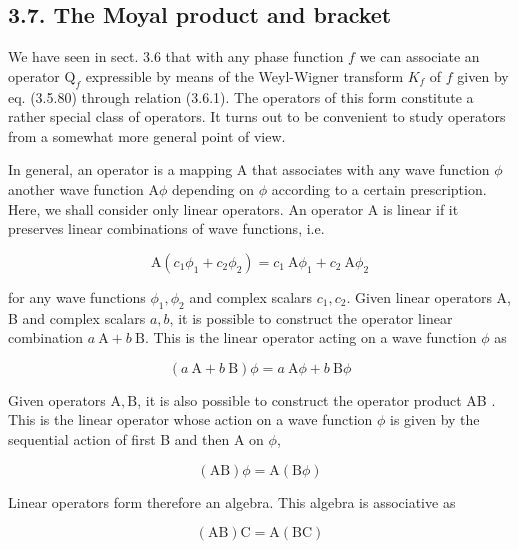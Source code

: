 \documentclass{article}
\begin{document}
\subsection*{3.7. The Moyal product and bracket}

We have seen in sect. 3.6 that with any phase function $f$ we can associate an operator $\mathrm{Q}_{f}$ expressible by means of the Weyl-Wigner transform $K_{f}$ of $f$ given by eq. (3.5.80) through relation (3.6.1). The operators of this form constitute a rather special class of operators. It turns out to be convenient to study operators from a somewhat more general point of view.

In general, an operator is a mapping A that associates with any wave function $\phi$ another wave function $\mathrm{A} \phi$ depending on $\phi$ according to a certain prescription. Here, we shall consider only linear operators. An operator A is linear if it preserves linear combinations of wave functions, i.e.
 
\begin{equation*}
\mathrm{A}\left(c_{1} \phi_{1}+c_{2} \phi_{2}\right)=c_{1} \mathrm{~A} \phi_{1}+c_{2} \mathrm{~A} \phi_{2} \tag{3.7.1}
\end{equation*}
 
for any wave functions $\phi_{1}, \phi_{2}$ and complex scalars $c_{1}, c_{2}$. Given linear operators A, B and complex scalars $a, b$, it is possible to construct the operator linear combination $a \mathrm{~A}+b \mathrm{~B}$. This is the linear operator acting on a wave function $\phi$ as
 
\begin{equation*}
(a \mathrm{~A}+b \mathrm{~B}) \phi=a \mathrm{~A} \phi+b \mathrm{~B} \phi \tag{3.7.2}
\end{equation*}
 

Given operators $\mathrm{A}, \mathrm{B}$, it is also possible to construct the operator product AB . This is the linear operator whose action on a wave function $\phi$ is given by the sequential action of first B and then A on $\phi$,
 
\begin{equation*}
(\mathrm{AB}) \phi=\mathrm{A}(\mathrm{B} \phi) \tag{3.7.3}
\end{equation*}
 

Linear operators form therefore an algebra. This algebra is associative as
 
\begin{equation*}
(\mathrm{AB}) \mathrm{C}=\mathrm{A}(\mathrm{BC}) \tag{3.7.4}
\end{equation*}
 
\end{document}
